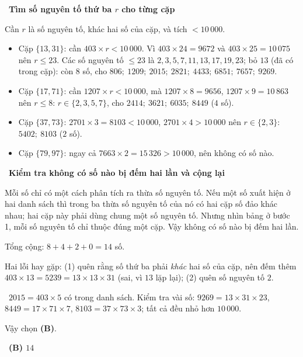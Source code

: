 \documentclass[11pt]{article}
\providecommand{\AnsWord}{Đáp số}
\newcommand{\ans}[1]{\par\smallskip{\bfseries\color{tmGreen!88!black}\AnsWord:}\ {\bfseries\color{AnsRed}#1}\par}
\newcommand{\step}[2]{\par\smallskip\noindent{\bfseries\color{tmBlue!85!black}\StepWord~#1.}\ {\bfseries #2}\par\nopagebreak}
\newcommand{\verify}[1]{\par\smallskip\noindent{\bfseries\color{tmGreen!80!black}\faCheckCircle\ \CheckWord}\ #1\par}
\def\AnsWord{Đáp số}
\def\StepWord{Bước}
\def\CheckWord{Thử lại:}
\begin{document}
{\step{3}{Tìm số nguyên tố thứ ba $r$ cho từng cặp}
Cần $r$ là số nguyên tố, khác hai số của cặp, và tích $<10\,000$.
\begin{itemize}[leftmargin=1.2em,itemsep=1pt,topsep=2pt]
\item Cặp $\{13,31\}$: cần $403\times r<10\,000$. Vì $403\times24=9672$ và $403\times25=10\,075$ nên $r\le23$.
Các số nguyên tố $\le23$ là $2,3,5,7,11,13,17,19,23$; bỏ $13$ (đã có trong cặp): còn $8$ số, cho
$806;\ 1209;\ 2015;\ 2821;\ 4433;\ 6851;\ 7657;\ 9269$.
\item Cặp $\{17,71\}$: cần $1207\times r<10\,000$, mà $1207\times8=9656$, $1207\times9=10\,863$ nên $r\le8$:
$r\in\{2,3,5,7\}$, cho $2414;\ 3621;\ 6035;\ 8449$ ($4$ số).
\item Cặp $\{37,73\}$: $2701\times3=8103<10\,000$, $2701\times4>10\,000$ nên $r\in\{2,3\}$: $5402;\ 8103$ ($2$ số).
\item Cặp $\{79,97\}$: ngay cả $7663\times2=15\,326>10\,000$, nên không có số nào.
\end{itemize}

\step{4}{Kiểm tra không có số nào bị đếm hai lần và cộng lại}
\begin{proofbox}Mỗi số chỉ có một cách phân tích ra thừa số nguyên tố. Nếu một số xuất hiện ở hai danh sách thì
trong ba thừa số nguyên tố của nó có hai cặp số đảo khác nhau; hai cặp này phải dùng chung một số nguyên tố.
Nhưng nhìn bảng ở bước 1, mỗi số nguyên tố chỉ thuộc đúng một cặp. Vậy không có số nào bị đếm hai lần.\end{proofbox}
Tổng cộng: $8+4+2+0=14$ số.
\begin{warnbox}Hai lỗi hay gặp: (1) quên rằng số thứ ba phải \emph{khác} hai số của cặp, nên đếm thêm
$403\times13=5239=13\times13\times31$ (sai, vì $13$ lặp lại); (2) quên số nguyên tố $2$.\end{warnbox}
\verify{$2015=403\times5$ có trong danh sách. Kiểm tra vài số: $9269=13\times31\times23$, $8449=17\times71\times7$,
$8103=37\times73\times3$; tất cả đều nhỏ hơn $10\,000$.}
Vậy chọn \textbf{(B)}.
\ans{(B) $14$}
}
\end{document}
